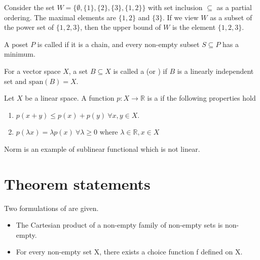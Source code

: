 \documentclass[11pt,a4paper]{article}
\begin{document}
\begin{example}
    Consider the set $W = \{\emptyset, \{1\}, \{2\}, \{3\}, \{1,2\}\}$  with set inclusion $\subseteq$ as a partial ordering. The maximal elements are $\{1, 2\}$ and $\{3\}$. If we view $W$ as a subset of the power set of $\{1, 2, 3\}$, then the upper bound of $W$ is the element $\{1, 2, 3\}$.
\end{example}

\begin{definition}
    A poset $P$ is called  if it is a chain, and every non-empty subset $S\subseteq P$ has a minimum.
\end{definition}


\begin{definition}
    For a vector space $X$, a set $B\subseteq X$ is called a  (or ) if $B$ is a linearly independent set and $\text{span}(B) = X$.
\end{definition}

\begin{definition}
    Let $X$ be a linear space. A function $p : X \rightarrow \mathbb{R}$ is a  if the following properties hold 
    \begin{enumerate}
        \item {} $p(x + y) \leq p(x) + p(y)\ \forall x, y \in X$.
        \item {} $p(\lambda x) = \lambda p(x)\ \forall \lambda \geq 0$ where  $\lambda \in \mathbb{R}, x \in X$
    \end{enumerate}
\end{definition}

\begin{example}
    Norm is an example of sublinear functional which is not linear.
\end{example}

\section{Theorem statements}

Two formulations of  are given.
\begin{itemize}
    \item The Cartesian product of a non-empty family of non-empty sets is non-empty.
    \item For every non-empty set X, there exists a choice function f defined on X.
\end{itemize}
\end{document}
